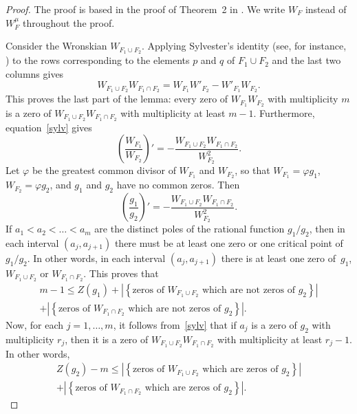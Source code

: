 \documentclass[10pt]{article}
\theoremstyle{plain}
\theoremstyle{definition}
\numberwithin{equation}{section} %
\begin{document}
\begin{proof}
The proof is based in the proof of Theorem~2 in \cite[p.~6]{KS}. We write $W_F$ instead of $W_F^\mu$ throughout the proof.

Consider the Wronskian $W_{F_1\cup F_2}$. Applying Sylvester's identity (see, for instance, \cite[p.~26]{KS}) to the rows corresponding to the elements $p$ and $q$ of $F_1\cup F_2$ and the last two columns gives
\begin{equation}
\label{sylv}
   W_{F_1\cup F_2} W_{F_1\cap F_2} = W_{F_1}W'_{F_2}-W'_{F_1}W_{F_2}.
\end{equation}
This proves the last part of the lemma: every zero of $W_{F_1}W_{F_2}$ with multiplicity $m$ is a zero of $W_{F_1 \cup F_2} W_{F_1 \cap F_2}$ with multiplicity at least $m-1$.
Furthermore, equation~\eqref{sylv} gives
\[
   \left(\frac{W_{F_1}}{W_{F_2}}\right)'
   = - \frac{W_{F_1\cup F_2} W_{F_1\cap F_2}}{W_{F_2}^2}.
\]
Let $\varphi$ be the greatest common divisor of $W_{F_1}$ and $W_{F_2}$, so that $W_{F_1} = \varphi g_1$, $W_{F_2} = \varphi g_2$, and $g_1$ and $g_2$ have no common zeros. Then
\[
   \left(\frac{g_1}{g_2}\right)'
   = - \frac{W_{F_1\cup F_2} W_{F_1\cap F_2}}{W_{F_2}^2}.
\]
If $a_1 < a_2 < \dots < a_m$ are the distinct poles of the rational function $g_1/g_2$, then in each interval $(a_j,a_{j+1})$ there must be at least one zero or one critical point of $g_1/g_2$. In other words, in each interval $(a_j,a_{j+1})$ there is at least one zero of~$g_1$, $W_{F_1\cup F_2}$ or $W_{F_1\cap F_2}$. This proves that
\begin{multline}
\label{zg1}
   m-1 \leq Z(g_1)
   +
   \left| \left\{\text{zeros of }W_{F_1 \cup F_2}
   \text{ which are not zeros of } g_2 \right\} \right|
   \\
   +
   \left| \left\{\text{zeros of }W_{F_1 \cap F_2}
   \text{ which are not zeros of } g_2 \right\} \right|.
\end{multline}
Now, for each $j = 1, \dots,m$, it follows from~\eqref{sylv} that if $a_j$ is a zero of $g_2$ with multiplicity $r_j$, then it is a zero of $W_{F_1\cup F_2} W_{F_1\cap F_2}$ with multiplicity at least $r_j-1$. In other words,
\begin{multline}
\label{comunes}
   Z(g_2) - m \leq
   \left| \left\{\text{zeros of }W_{F_1 \cup F_2}
   \text{ which are zeros of } g_2 \right\} \right|
   \\
   +
   \left| \left\{\text{zeros of }W_{F_1 \cap F_2}
   \text{ which are zeros of } g_2 \right\} \right|.
\end{multline}

\end{proof}
\end{document}
